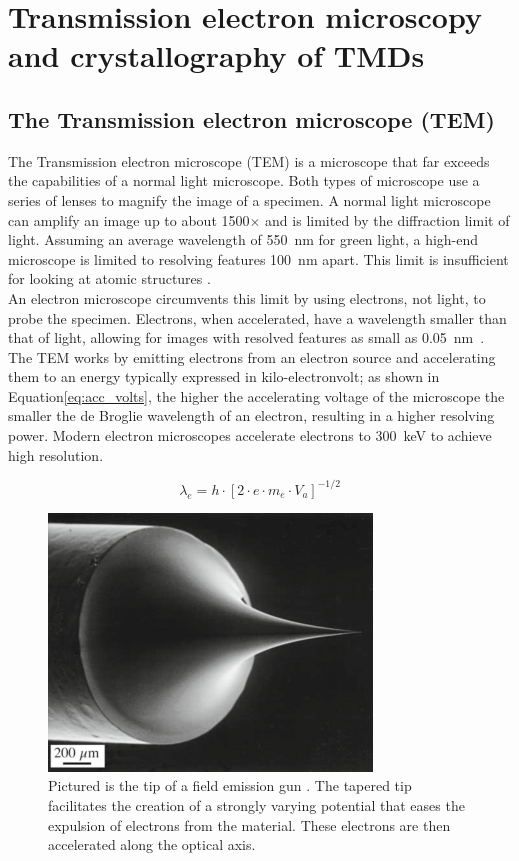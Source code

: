 \chapter{Transmission electron microscopy and crystallography of TMDs}
\label{sec:theory}

\section{The Transmission electron microscope (TEM)}
The Transmission electron microscope (TEM) is a microscope that far exceeds the capabilities of a normal light microscope. Both types of microscope use a series of lenses to magnify the image of a specimen.
A normal light microscope can amplify an image up to about 1500$\times$ and is limited by the diffraction limit of light. Assuming an average wavelength of \SI{550}{\nm} for green light, a high-end microscope is limited to resolving features \SI{100}{\nm} apart. This limit is insufficient for looking at atomic structures \cite{PhysRevLett.106.193905}.\\
An electron microscope circumvents this limit by using electrons, not light, to probe the specimen. Electrons, when accelerated, have a wavelength smaller than that of light, allowing for images with resolved features as small as \SI{0.05}{\nm}~\cite{kisielowski_freitag_bischoff_van}. 
The TEM works by emitting electrons from an electron source and accelerating them to an energy typically expressed in kilo-electronvolt; as shown in Equation\ref{eq:acc_volts}, the higher the accelerating voltage of the microscope the smaller the de Broglie wavelength of an electron, resulting in a higher resolving power. Modern electron microscopes accelerate electrons to \SI{300}{\kilo \electronvolt} to achieve high resolution.

\begin{equation}
    \lambda_e = h\cdot \left[ 2 \cdot e \cdot m_e \cdot V_a \right]^{-1/2}
    \label{eq:acc_volts}
\end{equation}

\begin{figure}
    \centering
    \includegraphics[keepaspectratio, width=0.5\linewidth]{resources/Figures/feg.png} 
    \caption{Pictured is the tip of a field emission gun \cite{Williams2009-ww}. The tapered tip facilitates the creation of a strongly varying potential that eases the expulsion of electrons from the material. These electrons are then accelerated along the optical axis.}
    \label{fig:feg}
\end{figure}

